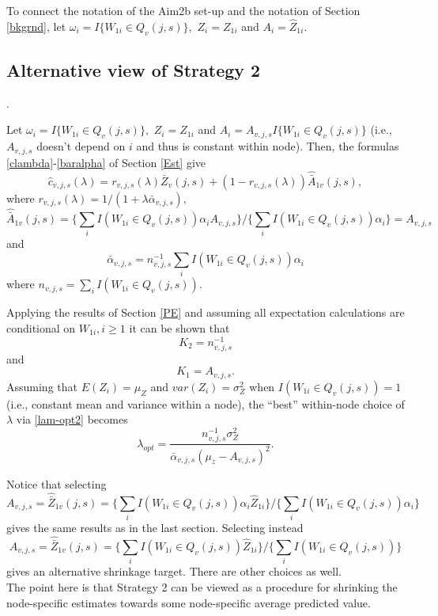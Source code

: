 \documentclass[12pt]{article}
\begin{document}
To connect the notation of the Aim2b set-up and the notation of
Section \ref{bkgrnd}, let $\omega_i = I\{ W_{1i} \in Q_{v}(j,s) \},$
$Z_i = Z_{1i}$ and $A_i = \hat Z_{1i}$. 



\subsection{Alternative view of Strategy 2}.

Let $\omega_i = I\{ W_{1i} \in Q_{v}(j,s) \},$ $Z_i = Z_{1i}$ and $A_i
= A_{v,j,s} I\{ W_{1i} \in Q_{v}(j,s) \}$ (i.e., $A_{v,j,s}$ doesn't
depend on $i$ and thus is constant within node).  Then, the formulas
\eqref{clambda}-\eqref{baralpha} of Section \ref{Est} give
 \[
\widehat{c}_{v,j,s}(\lambda) = r_{v,j,s}(\lambda) \bar{Z}_v(j,s) +
(1-r_{v,j,s}(\lambda)) \hat{\bar{A}}_{1v}(j,s),
\]
where $r_{v,j,s}(\lambda) = 1/(1 + \lambda \bar{\alpha}_{v,j,s}),$
\[
\hat{\bar{A}}_{1v}(j,s) =
\{ \sum_i I(W_{1i} \in Q_{v}(j,s)) \alpha_i  A_{v,j,s}  \}
/ \{ \sum_i I(W_{1i} \in Q_{v}(j,s)) \alpha_i \} = A_{v,j,s}
\]
and
\[
\bar{\alpha}_{v,j,s} =  n^{-1}_{v,j,s} \sum_i I(W_{1i} \in Q_{v}(j,s)) \alpha_i
\]
where $n_{v,j,s} =  \sum_i I( W_{1i} \in Q_{v}(j,s) ).$

Applying the results of Section \ref{PE} and assuming all expectation
calculations are conditional on $W_{1i}, i \geq 1$ it can be shown that
\[
K_2 = n^{-1}_{v,j,s}
\]
and
\[
K_1 = A_{v,j,s}.
\]
Assuming that $E(Z_i) = \mu_Z$ and $var(Z_i) = \sigma^2_Z$ when $I(
W_{1i} \in Q_{v}(j,s) ) =1$ (i.e., constant mean and variance within a
node), the ``best'' within-node choice of $\lambda$ via
\eqref{lam-opt2} becomes
\[
\lambda_{opt} = \frac{n^{-1}_{v,j,s} \sigma^2_Z}{ \bar{\alpha}_{v,j,s} (\mu_z -  A_{v,j,s})^2}.
\]

Notice that selecting
\[
A_{v,j,s} = \hat{\bar{Z}}_{1v}(j,s) =
\{ \sum_i I(W_{1i} \in Q_{v}(j,s)) \alpha_i  \hat{Z}_{1i} \}
/ \{ \sum_i I(W_{1i} \in Q_{v}(j,s)) \alpha_i \}
\]
gives the same results as in the last section. Selecting instead
\[
A_{v,j,s} = \hat{\bar{Z}}_{1v}(j,s) =
\{ \sum_i I(W_{1i} \in Q_{v}(j,s))  \hat{Z}_{1i} \}
/ \{ \sum_i I(W_{1i} \in Q_{v}(j,s))  \}
\]
gives an alternative shrinkage target.  There are other choices as well.\\

The point here is that Strategy 2 can be viewed as a procedure for
shrinking the node-specific estimates towards some node-specific
average predicted value.
\end{document}
